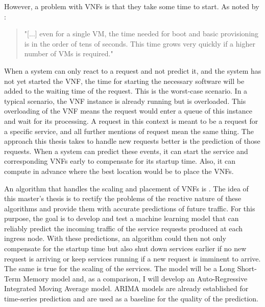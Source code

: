         However, a problem with VNFs is that they take some time to start.
        As noted by \cite[p.108-109]{Mijumbi}:
        \begin{quote}
            "[...] even for a single VM, the time needed for boot and basic provisioning is in the order of tens of seconds. This time grows very quickly if a higher number of VMs is required."
        \end{quote}
        When a system can only react to a request and not predict it, and the system has not yet started the VNF, the time for starting the necessary software will be added to the waiting time of the request.
        This is the worst-case scenario.
        In a typical scenario, the VNF instance is already running but is overloaded.
This overloading of the VNF means the request would enter a queue of this instance and wait for its processing.
        A request in this context is meant to be a request for a specific service, and all further mentions of request mean the same thing.
        The approach this thesis takes to handle new requests better is the prediction of those requests.
        When a system can predict these events, it can start the service and corresponding VNFs early to compensate for its startup time.
        Also, it can compute in advance where the best location would be to place the VNFs.
        
        An algorithm that handles the scaling and placement of VNFs is \cite{draxlerScaling}.       
        The idea of this master's thesis is to rectify the problems of the reactive nature of these algorithms and provide them with accurate predictions of future traffic.
        For this purpose, the goal is to develop and test a machine learning model that can reliably predict the incoming traffic of the service requests produced at each ingress node.
        With these predictions, an algorithm could then not only compensate for the startup time but also shut down services earlier if no new request is arriving or keep services running if a new request is imminent to arrive.
        The same is true for the scaling of the services.
        The model will be a Long Short-Term Memory model and, as a comparison, I will develop an Auto-Regressive Integrated Moving Average model.
        ARIMA models are already established for time-series prediction and are used as a baseline for the quality of the prediction.        